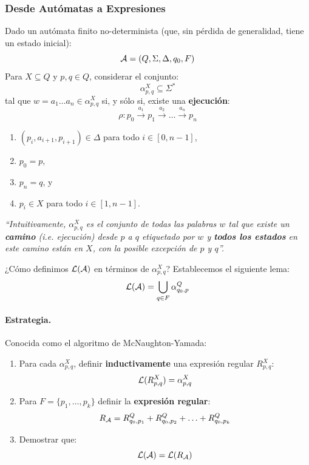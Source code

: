 \subsubsection{Desde Autómatas a Expresiones}

Dado un autómata finito no-determinista (que, sin pérdida de generalidad, tiene un estado inicial):
$$
    \mathcal{A} = (Q, \Sigma, \Delta, q_0, F)
$$
Para $X \subseteq Q$ y $p,q \in Q$, considerar el conjunto:
$$
    \alpha_{p,q}^X \subseteq \Sigma^*
$$
tal que $w = a_1 \ldots a_n \in \alpha_{p,q}^X$ si, y sólo si, existe una \textbf{ejecución}:
$$
    \rho: p_0 \stackrel{a_1}{\rightarrow} p_1 \stackrel{a_2}{\rightarrow} \ldots \stackrel{a_n}{\rightarrow} p_n
$$
\begin{enumerate}
    \item $\left(p_i, a_{i+1}, p_{i+1}\right) \in \Delta$ para todo $i \in [0,n-1]$,
    \item $p_0 = p$,
    \item $p_n = q$, y
    \item $p_i \in X$ para todo $i \in [1,n-1]$.
\end{enumerate}

\textit{``Intuitivamente, $\alpha_{p,q}^X$ es el conjunto de todas las palabras $w$ tal que existe un \textbf{camino} (i.e. ejecución) desde $p$ a $q$ etiquetado por $w$ y \textbf{todos los estados} en este camino están en $X$, con la posible excepción de $p$ y $q$''.} \medbreak

¿Cómo definimos $\mathcal{L}(\mathcal{A})$ en términos de $\alpha_{p,q}^X$? Establecemos el siguiente lema:
$$
    \mathcal{L}(\mathcal{A}) = \bigcup_{q \in F} \alpha_{q_0,p}^Q
$$

\paragraph{Estrategia.} Conocida como el algoritmo de McNaughton-Yamada:
\begin{enumerate}
    \item Para cada $\alpha_{p,q}^X$, definir \textbf{inductivamente} una expresión regular $R_{p,q}^X$:
          $$
              \mathcal{L}(R_{p,q}^X) = \alpha_{p,q}^X
          $$

    \item Para $F = \{p_1, \ldots, p_k\}$ definir la \textbf{expresión regular}:
          $$
              R_{\mathcal{A}} = R_{q_0, p_1}^Q+R_{q_0, p_2}^Q+\ldots+R_{q_0, p_k}^Q
          $$

    \item Demostrar que:
          $$
              \mathcal{L}(\mathcal{A}) = \mathcal{L}(R_{\mathcal{A}})
          $$
\end{enumerate}

